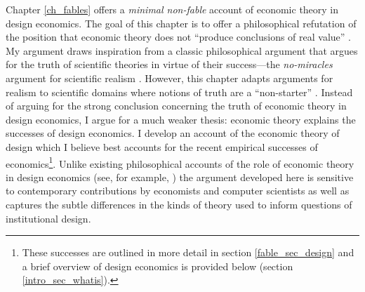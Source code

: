 Chapter \ref{ch_fables} offers a \textit{minimal non-fable} account of economic theory in design economics. The goal of this chapter is to offer a philosophical refutation of the position that economic theory does not ``produce conclusions of real value'' \autocite[37]{rubinstein2012}. My argument draws inspiration from a classic philosophical argument that argues for the truth of scientific theories in virtue of their success---the \textit{no-miracles} argument for scientific realism \autocite{putnam1975}. However, this chapter adapts arguments for realism to scientific domains where notions of truth are a ``non-starter'' \autocite[328]{alexandrova2009}. Instead of arguing for the strong conclusion concerning the truth of economic theory in design economics, I argue for a much weaker thesis: economic theory explains the successes of design economics. I develop an account of the economic theory of design which I believe best accounts for the recent empirical successes of economics\footnote{These successes are outlined in more detail in section \ref{fable_sec_design} and a brief overview of design economics is provided below (section \ref{intro_sec_whatis}).}. Unlike existing philosophical accounts of the role of economic theory in design economics (see, for example, \cite{alexandrova2009, ross2008}) the argument developed here is sensitive to contemporary contributions by economists and computer scientists as well as captures the subtle differences in the kinds of theory used to inform questions of institutional design.


